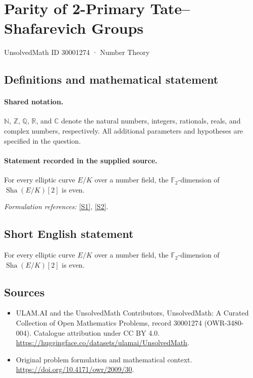 \documentclass[11pt]{article}
\newcommand{\sref}[2]{\hyperlink{source:#1:#2}{[S#2]}}
\begin{document}
\setcounter{section}{30001273}
\section{Parity of 2-Primary Tate–Shafarevich Groups}\label{30001274}
{\small UnsolvedMath ID 30001274 · Number Theory}
\subsection{Definitions and mathematical statement}

\paragraph{Shared notation.}$\mathbb N$, $\mathbb Z$, $\mathbb Q$, $\mathbb R$, and $\mathbb C$ denote the natural numbers, integers, rationals, reals, and complex numbers, respectively. All additional parameters and hypotheses are specified in the question.


\paragraph{Statement recorded in the supplied source.}
For every elliptic curve $E/K$ over a number field, the $\mathbb{F}_2$-dimension of $\operatorname{Sha}(E/K)[2]$ is even.
\par\smallskip\textit{Formulation references:} \sref{30001274}{1}, \sref{30001274}{2}.
\subsection{Short English statement}
For every elliptic curve $E/K$ over a number field, the $\mathbb{F}_2$-dimension of $\operatorname{Sha}(E/K)[2]$ is even.
\subsection{Sources}
\begin{itemize}
\item[\hypertarget{source:30001274:1}{S1}] ULAM.AI and the UnsolvedMath Contributors, UnsolvedMath: A Curated Collection of Open Mathematics Problems, record 30001274 (OWR-3480-004). Catalogue attribution under CC BY 4.0.
\url{https://huggingface.co/datasets/ulamai/UnsolvedMath}.
\item[\hypertarget{source:30001274:2}{S2}] Original problem formulation and mathematical context.
\url{https://doi.org/10.4171/owr/2009/30}.
\end{itemize}
\label{end:30001274}
\end{document}
